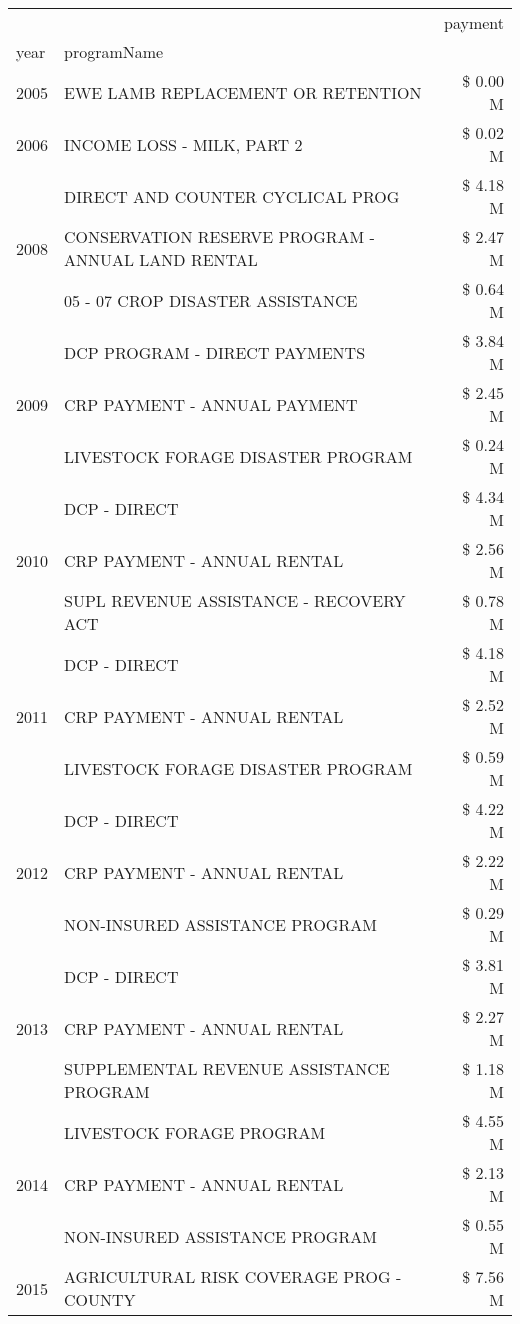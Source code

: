 \begin{tabular}{llr}
\toprule
 &  & payment \\
year & programName &  \\
\midrule
2005 & EWE LAMB REPLACEMENT OR RETENTION & \$ 0.00 M \\
\cline{1-3}
2006 & INCOME LOSS - MILK, PART 2 & \$ 0.02 M \\
\cline{1-3}
\multirow[t]{3}{*}{2008} & DIRECT AND COUNTER CYCLICAL PROG & \$ 4.18 M \\
 & CONSERVATION RESERVE PROGRAM - ANNUAL LAND RENTAL & \$ 2.47 M \\
 & 05 - 07 CROP DISASTER ASSISTANCE & \$ 0.64 M \\
\cline{1-3}
\multirow[t]{3}{*}{2009} & DCP PROGRAM - DIRECT PAYMENTS & \$ 3.84 M \\
 & CRP PAYMENT - ANNUAL PAYMENT & \$ 2.45 M \\
 & LIVESTOCK FORAGE DISASTER  PROGRAM & \$ 0.24 M \\
\cline{1-3}
\multirow[t]{3}{*}{2010} & DCP - DIRECT & \$ 4.34 M \\
 & CRP PAYMENT - ANNUAL RENTAL & \$ 2.56 M \\
 & SUPL REVENUE ASSISTANCE - RECOVERY ACT & \$ 0.78 M \\
\cline{1-3}
\multirow[t]{3}{*}{2011} & DCP - DIRECT & \$ 4.18 M \\
 & CRP PAYMENT - ANNUAL RENTAL & \$ 2.52 M \\
 & LIVESTOCK FORAGE DISASTER PROGRAM & \$ 0.59 M \\
\cline{1-3}
\multirow[t]{3}{*}{2012} & DCP - DIRECT & \$ 4.22 M \\
 & CRP PAYMENT - ANNUAL RENTAL & \$ 2.22 M \\
 & NON-INSURED ASSISTANCE PROGRAM & \$ 0.29 M \\
\cline{1-3}
\multirow[t]{3}{*}{2013} & DCP - DIRECT & \$ 3.81 M \\
 & CRP PAYMENT - ANNUAL RENTAL & \$ 2.27 M \\
 & SUPPLEMENTAL REVENUE ASSISTANCE PROGRAM & \$ 1.18 M \\
\cline{1-3}
\multirow[t]{3}{*}{2014} & LIVESTOCK FORAGE PROGRAM & \$ 4.55 M \\
 & CRP PAYMENT - ANNUAL RENTAL & \$ 2.13 M \\
 & NON-INSURED ASSISTANCE PROGRAM & \$ 0.55 M \\
\cline{1-3}
\multirow[t]{3}{*}{2015} & AGRICULTURAL RISK COVERAGE PROG - COUNTY & \$ 7.56 M \\

\end{tabular}

